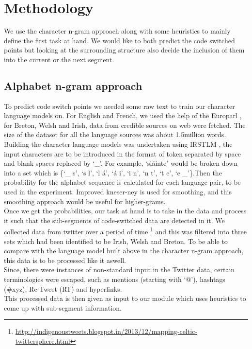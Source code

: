 \documentclass[11pt]{article}
\begin{document}
\section{Methodology}
\label{sec:method}
We use the character n-gram approach along with some heuristics to mainly define the first task at hand. We would like to both predict the code switched points but looking at the surrounding structure also decide the inclusion of them into the current or the next segment. \\

\subsection{Alphabet n-gram approach}
\label{alphan}

To predict code switch points we needed some raw text to train our character language models on. For English and French, we used the help of the Europarl \cite{koehn2005europarl}, for Breton, Welsh and Irish, data from credible sources on web were fetched. The size of the dataset for all the language sources was about 1.5million words. \\
Building the character language models was undertaken using IRSTLM \cite{federico08a}, the input characters are to be introduced in the format of token separated by space and blank spaces replaced by `\_'. For example, `sl\'{a}inte' would be broken down into a set which is \{`\_ s', `s l', `l \'{a}', `\'{a} i', `i n', `n t', `t e', `e \_'\}.Then the probability for the alphabet sequence is calculated for each language pair, to be used in the experiment. Improved kneser-ney is used for smoothing, and this smoothing approach would be useful for higher-grams. \cite{kneser1995improved} \\

Once we get the probabilities, our task at hand is to take in the data and process it such that the  sub-segments of code-switched data are detected in it. We collected data from twitter over a period of time \footnote{\url{http://indigenoustweets.blogspot.in/2013/12/mapping-celtic-twittersphere.html}} and this was filtered into three sets which had been identified to be Irish, Welsh and Breton. To be able to compare with the language model built above in the character n-gram approach, this data is to be processed like it aswell. \\

Since, there were instances of non-standard input in the Twitter data, certain terminologies were escaped, such as mentions (starting with ‘@’), hashtags (\#xyz), Re-Tweet (RT) and hyperlinks.\\
This processed data is then given as input to our module which uses heuristics to come up with sub-segment information. \\
\end{document}
